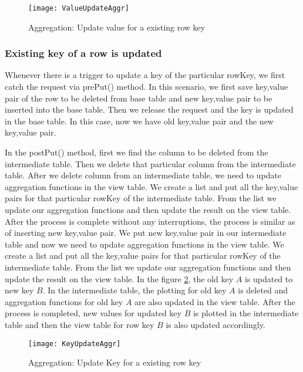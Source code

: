 \documentclass[11pt,a4paper,bibtotoc,idxtotoc,headsepline,footsepline,footexclude,BCOR12mm,DIV13]{scrbook}
\begin{document}
\begin{figure}
    \centering
    \texttt{[image: ValueUpdateAggr]}
    \caption{Aggregation: Update value for a existing row key}
    \label{sec:updatevalueforexistingkey}
    
\end{figure}  


\subsubsection{Existing key of a row is updated}
\label{subsubsec:keyupdate}

Whenever there is a trigger to update a key of the particular rowKey, we first catch the request via prePut() method. In this scenario, we first save key,value pair of the row to be deleted from base table and new key,value pair to be inserted into the base table. Then we release the request and the key is updated in the base table. In this case, now we have old key,value pair and the new key,value pair. 

In the postPut() method, first we find the column to be deleted from the intermediate table. Then we delete that particular column from the intermediate table. After we delete column from an intermediate table, we need to update aggregation functions in the view table. We create a list and put all the key,value pairs for that particular rowKey of the intermediate table. From the list we update our aggregation functions and then update the result on the view table. After the process is complete without any interruptions, the process is similar as of inserting new key,value pair. We put new key,value pair in our intermediate table and now we need to update aggregation functions in the view table. We create a list and put all the key,value pairs for that particular rowKey of the intermediate table. From the list we update our aggregation functions and then update the result on the view table. In the figure \ref{sec:updateKeyforexistingrow}, the old key $A$ is updated to new key $B$. In the intermediate table, the plotting for old key $A$ is deleted and aggregation functions for old key $A$ are also updated in the view table. After the process is completed, new values for updated key $B$ is plotted in the intermediate table and then the view table for row key $B$ is also updated accordingly.

\begin{figure}
    \centering
    \texttt{[image: KeyUpdateAggr]}
    \caption{Aggregation: Update Key for a existing row key}
    \label{sec:updateKeyforexistingrow}
    
\end{figure} 
\end{document}
